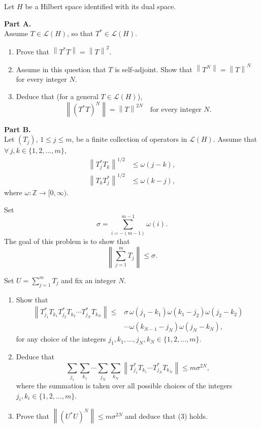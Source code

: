 \documentclass[12pt]{article}
\newcommand{\norm}[1]{\left\|#1\right\|}
\newcommand{\Z}{\mathbb{Z}}
\begin{document}
\medskip
 
Let $H$ be a Hilbert space identified with its dual space.
 
\medskip
 
\noindent\textbf{Part A.}\\
Assume $T \in \mathcal{L}(H)$, so that $T^* \in \mathcal{L}(H)$.
 
\begin{enumerate}
\item Prove that $\norm{T^*T} = \norm{T}^2$.
 
\item Assume in this question that $T$ is self-adjoint.
Show that $\norm{T^N} = \norm{T}^N$ for every integer $N$.
 
\item Deduce that (for a general $T \in \mathcal{L}(H)$),
\[
\norm{(T^*T)^N} = \norm{T}^{2N} \quad \text{for every integer } N.
\]
\end{enumerate}
 
\noindent\textbf{Part B.}\\
Let $(T_j)$, $1 \le j \le m$, be a finite collection of operators in $\mathcal{L}(H)$. Assume that
$\forall\, j, k \in \{1, 2, \ldots, m\}$,
\begin{align}
\norm{T_j^* T_k}^{1/2} &\le \omega(j-k), \tag{1}\\
\norm{T_k T_j^*}^{1/2} &\le \omega(k-j), \tag{2}
\end{align}
where $\omega : \Z \to [0,\infty)$.
 
Set
\[
\sigma = \sum_{i=-(m-1)}^{m-1} \omega(i).
\]
The goal of this problem is to show that
\begin{equation}\tag{3}
\left\|\sum_{j=1}^m T_j\right\| \le \sigma.
\end{equation}
 
Set $U = \sum_{j=1}^m T_j$ and fix an integer $N$.
 
\begin{enumerate}
\item Show that
\begin{align*}
\norm{T_{j_1}^* T_{k_1} T_{j_2}^* T_{k_2} \cdots T_{j_N}^* T_{k_N}}
\le{} &\sigma\,\omega(j_1 - k_1)\omega(k_1 - j_2)\omega(j_2 - k_2) \\
&\cdots\omega(k_{N-1} - j_N)\omega(j_N - k_N),
\end{align*}
for any choice of the integers $j_1, k_1, \ldots, j_N, k_N \in \{1, 2, \ldots, m\}$.
 
\item Deduce that
\[
\sum_{j_1}\sum_{k_1}\cdots\sum_{j_N}\sum_{k_N}
\norm{T_{j_1}^* T_{k_1} \cdots T_{j_N}^* T_{k_N}} \le m\sigma^{2N},
\]
where the summation is taken over all possible choices of the integers $j_i, k_i \in \{1, 2, \ldots, m\}$.
 
\item Prove that $\norm{(U^*U)^N} \le m\sigma^{2N}$ and deduce that (3) holds.
\end{enumerate}
 
\end{document}
